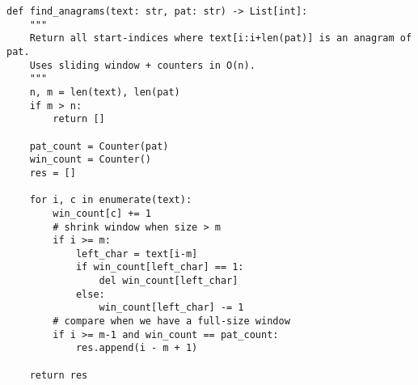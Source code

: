 \begin{verbatim}
def find_anagrams(text: str, pat: str) -> List[int]:
    """
    Return all start-indices where text[i:i+len(pat)] is an anagram of pat.
    Uses sliding window + counters in O(n).
    """
    n, m = len(text), len(pat)
    if m > n:
        return []

    pat_count = Counter(pat)
    win_count = Counter()
    res = []

    for i, c in enumerate(text):
        win_count[c] += 1
        # shrink window when size > m
        if i >= m:
            left_char = text[i-m]
            if win_count[left_char] == 1:
                del win_count[left_char]
            else:
                win_count[left_char] -= 1
        # compare when we have a full-size window
        if i >= m-1 and win_count == pat_count:
            res.append(i - m + 1)

    return res
\end{verbatim}
% 
